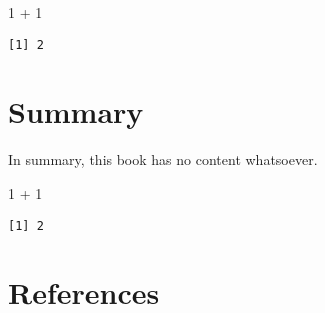 \documentclass[
  letterpaper,
  DIV=11,
  numbers=noendperiod]{scrreprt}
\newenvironment{Shaded}{\begin{snugshade}}{\end{snugshade}}
\newcommand{\DecValTok}[1]{\textcolor[rgb]{0.68,0.00,0.00}{#1}}
\newcommand{\SpecialCharTok}[1]{\textcolor[rgb]{0.37,0.37,0.37}{#1}}
\begin{document}
\begin{Shaded}
\begin{Highlighting}[]
\DecValTok{1} \SpecialCharTok{+} \DecValTok{1}
\end{Highlighting}
\end{Shaded}

\begin{verbatim}
[1] 2
\end{verbatim}


\chapter{Summary}\label{summary-3}

In summary, this book has no content whatsoever.

\begin{Shaded}
\begin{Highlighting}[]
\DecValTok{1} \SpecialCharTok{+} \DecValTok{1}
\end{Highlighting}
\end{Shaded}

\begin{verbatim}
[1] 2
\end{verbatim}


\chapter*{References}\label{references}


\label{refs}
\end{document}
